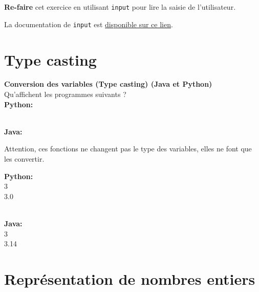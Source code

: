 \begin{Exercice}[5 minutes]
\textbf{Re-faire} cet exercice en utilisant \texttt{input} pour lire la saisie de l'utilisateur.
\begin{conseil}
La documentation de \texttt{input} est \href{https://docs.python.org/fr/3.13/library/functions.html\#input}{disponible sur ce lien}.
\end{conseil} 

\begin{solution}
 
\end{solution}

\begin{solution}
 
\end{solution}
\end{Exercice}

\section{Type casting}


\begin{Exercice}[5 minutes] \textbf{Conversion des variables (Type casting) (Java et Python)}\\
   Qu'affichent les programmes suivants ? \\
   
   \textbf{Python:}
   
   
   \textbf{\\Java:}
   
    
   
    \begin{conseil}
      	Attention, ces fonctions ne changent pas le type des variables, elles ne font que les convertir.
        
    \end{conseil}
    \begin{solution}
     
    \textbf{Python:}\\
    3\\
    3.0
    
    \textbf{\\Java:}\\
    3\\
    3.14 \\
    \end{solution}   
\end{Exercice}


\section{Représentation de nombres entiers}

